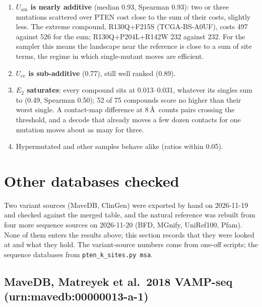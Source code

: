\documentclass[11pt,a4paper]{article}
\newcommand{\file}[1]{\texttt{#1}}
\newcommand{\Uam}{U_{\mathrm{am}}}
\newcommand{\Uce}{U_{\mathrm{ce}}}
\newcommand{\Etwo}{E_{2}}
\begin{document}
\begin{enumerate}
\item \textbf{$\Uam$ is nearly additive} (median 0.93, Spearman 0.93): two or
  three mutations scattered over PTEN cost close to the sum of their costs,
  slightly less. The extreme compound, R130Q+F215S (TCGA-BS-A0UF), costs 497
  against 526 for the sum; R130Q+P204L+R142W 232 against 232. For the sampler
  this means the landscape near the reference is close to a sum of site
  terms, the regime in which single-mutant moves are efficient.
\item \textbf{$\Uce$ is sub-additive} (0.77), still well ranked (0.89).
\item \textbf{$\Etwo$ saturates}: every compound sits at 0.013--0.031,
  whatever its singles sum to (0.49, Spearman 0.50); 52 of 75 compounds score
  no higher than their worst single. A contact-map difference at 8\,\AA\ counts
  pairs crossing the threshold, and a decode that already moves a few dozen
  contacts for one mutation moves about as many for three.
\item Hypermutated and other samples behave alike (ratios within 0.05).
\end{enumerate}

\section{Other databases checked}

Two variant sources (MaveDB, ClinGen) were exported by hand on 2026-11-19 and
checked against the merged table, and the natural reference was rebuilt from
four more sequence sources on 2026-11-20 (BFD, MGnify, UniRef100, Pfam). None of them enters the results
above; this section records that they were looked at and what they hold. The
variant-source numbers come from one-off scripts; the sequence databases from
\file{pten\_k\_sites.py msa}.

\subsection{MaveDB, Matreyek et al.\ 2018 VAMP-seq (urn:mavedb:00000013-a-1)}
\end{document}
